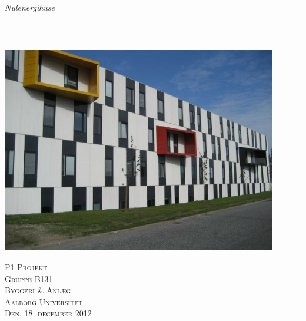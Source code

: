 \thispagestyle{empty}
\begin{flushright}
\vspace{3cm}

\phantom{hul}

\phantom{hul}

\phantom{hul}

\textsl{\Huge Nulenergihuse} \\ \vspace{1cm}

\rule{13cm}{3mm} \\ \vspace{1.5cm}
\vspace{1cm}

\includegraphics[width=0.9\textwidth]{billeder/forside.jpg}

\vspace{2cm} 
\textsc{\Large P1 Projekt \\
Gruppe B131 \\
Byggeri \& Anlæg\\
Aalborg Universitet\\
Den. 18. december 2012\\}
\end{flushright}
